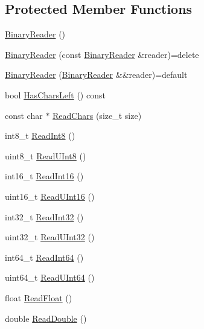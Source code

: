 \subsection*{Protected Member Functions}
\begin{DoxyCompactItemize}
\item 
\hyperlink{classmage_1_1_binary_reader_aab82579cef4f2f022273cf1adfcc8497}{Binary\+Reader} ()
\item 
\hyperlink{classmage_1_1_binary_reader_a8c1ff948f1d056439f3d8cc37d7f507c}{Binary\+Reader} (const \hyperlink{classmage_1_1_binary_reader}{Binary\+Reader} \&reader)=delete
\item 
\hyperlink{classmage_1_1_binary_reader_a5d9504fb2556cb346713bceacc3237dd}{Binary\+Reader} (\hyperlink{classmage_1_1_binary_reader}{Binary\+Reader} \&\&reader)=default
\item 
bool \hyperlink{classmage_1_1_binary_reader_a35b10713dca7a416b73b28d5f6aaf600}{Has\+Chars\+Left} () const
\item 
const char $\ast$ \hyperlink{classmage_1_1_binary_reader_af1e0e4ab815e23c72ab65fd7c0748d3f}{Read\+Chars} (size\+\_\+t size)
\item 
int8\+\_\+t \hyperlink{classmage_1_1_binary_reader_abfc9296a42190b21ad0ddb6e0ea119af}{Read\+Int8} ()
\item 
uint8\+\_\+t \hyperlink{classmage_1_1_binary_reader_af0378b53d82b20ec703e09b325d7a5d2}{Read\+U\+Int8} ()
\item 
int16\+\_\+t \hyperlink{classmage_1_1_binary_reader_abb90a96c485b3acb1af3bb3bd88b76c5}{Read\+Int16} ()
\item 
uint16\+\_\+t \hyperlink{classmage_1_1_binary_reader_ad93616adef47e0256f117b8a6f8ba8bb}{Read\+U\+Int16} ()
\item 
int32\+\_\+t \hyperlink{classmage_1_1_binary_reader_a8a463e4e5469e90246a40f2898abbc67}{Read\+Int32} ()
\item 
uint32\+\_\+t \hyperlink{classmage_1_1_binary_reader_a4decb312a91e30406b82178268053f53}{Read\+U\+Int32} ()
\item 
int64\+\_\+t \hyperlink{classmage_1_1_binary_reader_a404b0bdd39f4f1cd52cb8360896ac851}{Read\+Int64} ()
\item 
uint64\+\_\+t \hyperlink{classmage_1_1_binary_reader_a480f2bd7320beed37a71b8122c8550bd}{Read\+U\+Int64} ()
\item 
float \hyperlink{classmage_1_1_binary_reader_af18ab2185b7c766c2183ab54f4676d57}{Read\+Float} ()
\item 
double \hyperlink{classmage_1_1_binary_reader_aa9d54a457a85d6f488d818c0a3e56560}{Read\+Double} ()
\end{DoxyCompactItemize}
